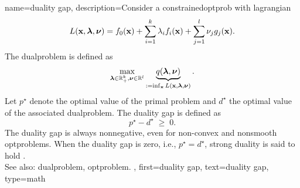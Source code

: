 {name={duality gap},
	description={Consider a \gls{constrainedoptprob} with \gls{lagrangian}
		\[
			L({\bf x}, {\bm \lambda}, {\bm \nu})
			= f_0({\bf x})
			+ \sum_{i=1}^{k} \lambda_i f_i({\bf x})
			+ \sum_{j=1}^{l} \nu_j g_j({\bf x}).
		\]
		The \gls{dualproblem} is defined as
		\[
			\max_{{\bm \lambda}\in \mathbb{R}_+^k,{\bm \nu} \in \mathbb{R}^l} 
			\underbrace{q({\bm \lambda},{\bm \nu})}_{:= \inf_{{\bf x}} L({\bf x},{\bm \lambda},{\bm \nu})}.
		\]
		Let $p^\star$ denote the optimal value of the primal problem and
		$d^\star$ the optimal value of the associated \gls{dualproblem}. The 
		duality gap is defined as
		\[
			p^\star - d^\star \;\ge\; 0.
		\]
		The duality gap is always nonnegative, even for non-\gls{convex} 
		and \gls{nonsmooth} \glspl{optproblem}. When the duality gap is
		zero, i.e., $p^\star = d^\star$, strong duality is said to hold \cite[Ch. 5]{BoydConvexBook}.
		\\
		See also: \gls{dualproblem}, \gls{optproblem}. },
	first={duality gap},
	text={duality gap},
	type=math
}

